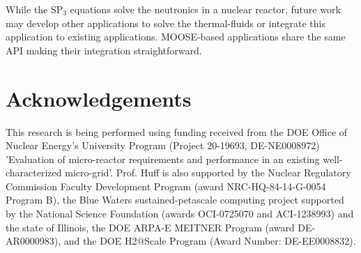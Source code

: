 \documentclass{anstrans}
\begin{document}
While the SP$_3$ equations solve the neutronics in a nuclear reactor, future work may develop other applications to solve the thermal-fluids or integrate this application to existing applications.
MOOSE-based applications share the same API making their integration straightforward.


\section{Acknowledgements}

This research is being performed using funding received from the DOE Office of Nuclear Energy's University Program (Project 20-19693, DE-NE0008972) 'Evaluation of micro-reactor requirements and performance in an existing well-characterized micro-grid'.
Prof. Huff is also supported by the Nuclear Regulatory Commission Faculty Development Program (award NRC-HQ-84-14-G-0054 Program B), the Blue Waters sustained-petascale computing project supported by the National Science Foundation (awards OCI-0725070 and ACI-1238993) and the state of Illinois, the DOE ARPA-E MEITNER Program (award DE-AR0000983), and the DOE H2@Scale Program (Award Number: DE-EE0008832).



\end{document}
